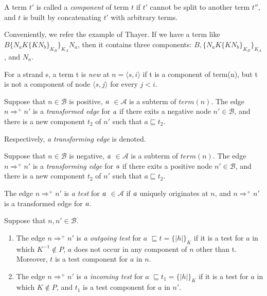 \begin{Definition}
 A term $t'$ is called a \emph{component} of term $t$ if $t'$ cannot be split to another term $t''$, and $t$ is built by concatenating $t'$ with arbitrary terms.
\end{Definition}

Conveniently, we refer the example of Thayer\cite{Thayer:2010aa}. If we have a term like $B\{N_aK\{KN_b\}_{K_B}\}_{K_A}N_a$, then it contains three components: $B, \{N_aK\{KN_b\}_{K_B}\}_{K_A}$, and $N_a$. 
 
\begin{Definition}
 For a strand s, a term t is \emph{new} at $n = \langle s,i\rangle$ if t is a component of term(n), but t is not a component of node $\langle s,j\rangle$ for every $j<i$. 
\end{Definition}

\begin{Definition} Suppose that $n \in \mathcal{B}$ is positive, $\emph{a}$ $\in \mathcal{A}$ is a subterm of $term(n)$. The edge $n \Rightarrow^+ n'$ is a \emph{transformed edge} for $\emph{a}$ if there exits a negative node $n' \in \mathcal{B}$, and there is a new component $t_2$ of $n'$ such that $a \sqsubseteq t_2$.
\end{Definition}

Respectively, \textit{a transforming edge} is denoted. 

\begin{Definition} Suppose that $n \in \mathcal{B}$ is negative, $\emph{a}$ $\in \mathcal{A}$ is a subterm of $term(n)$. The edge $n \Rightarrow^+ n'$ is a \emph{transforming edge} for $\emph{a}$ if there exits a positive node $n' \in \mathcal{B}$, and there is a new component $t_2$ of $n'$ such that $a \sqsubseteq t_2$.
\end{Definition}

\begin{Definition} 
The edge $n \Rightarrow^+ n'$ is \emph{a test} for $\emph{a}$ $\in \mathcal{A}$ if $\emph{a}$ uniquely originates at $n$, and $n \Rightarrow^+ n'$ is a transformed edge for $\emph{a}$. 
\end{Definition}

\begin{Definition} Suppose that $n, n' \in \mathcal{B}$.
\begin{enumerate}
\item The edge $n \Rightarrow^+ n'$ is \emph{a outgoing test} for $a$ $\sqsubseteq t = \{|h|\}_K$ if it is a test for $a$ in which $K^{-1} \not\in P$, $a$ does not occur in any component of $n$ other than t. Moreover, $t$ is a test component for $a$ in $n$.
\item The edge $n \Rightarrow^+ n'$ is \emph{a incoming test} for $a$ $\sqsubseteq t_1 = \{|h|\}_K$ if it is a test for $a$ in which $K \not\in P$, and $t_1$ is a test component for $a$ in $n'$.
\end{enumerate}
\end{Definition}

